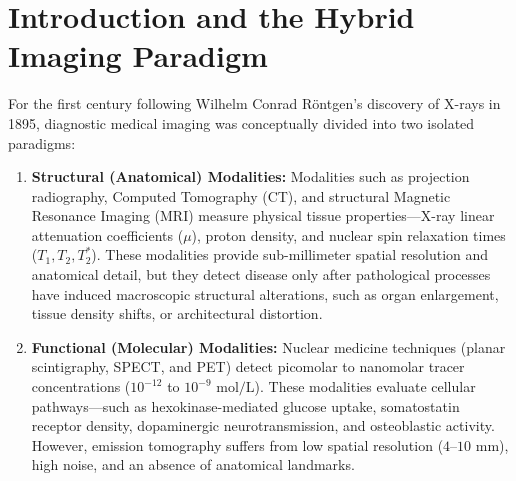 \documentclass[11pt,a4paper]{article}
\begin{document}
\begin{abstract}
We further evaluate statistical image reconstruction algorithms (MLEM, OSEM, and Bayesian penalized likelihood algorithms such as Q.Clear), NEMA NU-2 and NU-1 quality control standards, tracer compartmental kinetics, and high-impact clinical paradigms: oncologic staging via the Warburg effect ($^{18}\text{F}\text{-FDG}$), theranostics (PSMA and DOTATATE pairs with $^{68}\text{Ga}$ and $^{177}\text{Lu}$), cardiovascular absolute myocardial blood flow quantification (MBF/MFR), neurodegenerative dementia mapping (amyloid, tau, and FDG PET/MRI), pediatric radiation dose reduction ($50\text{--}80\%$), and ultra-sensitive total-body PET systems ($194\text{ cm}$ axial FOV).
\end{abstract}

\tableofcontents
\newpage

\section{Introduction and the Hybrid Imaging Paradigm}
For the first century following Wilhelm Conrad Röntgen's discovery of X-rays in 1895, diagnostic medical imaging was conceptually divided into two isolated paradigms:
\begin{enumerate}[leftmargin=2em]
    \item \textbf{Structural (Anatomical) Modalities:} Modalities such as projection radiography, Computed Tomography (CT), and structural Magnetic Resonance Imaging (MRI) measure physical tissue properties---X-ray linear attenuation coefficients ($\mu$), proton density, and nuclear spin relaxation times ($T_1, T_2, T_2^*$). These modalities provide sub-millimeter spatial resolution and anatomical detail, but they detect disease only after pathological processes have induced macroscopic structural alterations, such as organ enlargement, tissue density shifts, or architectural distortion.
    \item \textbf{Functional (Molecular) Modalities:} Nuclear medicine techniques (planar scintigraphy, SPECT, and PET) detect picomolar to nanomolar tracer concentrations ($10^{-12}$ to $10^{-9}\text{ mol/L}$). These modalities evaluate cellular pathways---such as hexokinase-mediated glucose uptake, somatostatin receptor density, dopaminergic neurotransmission, and osteoblastic activity. However, emission tomography suffers from low spatial resolution ($4\text{--}10\text{ mm}$), high noise, and an absence of anatomical landmarks.
\end{enumerate}
\end{document}

